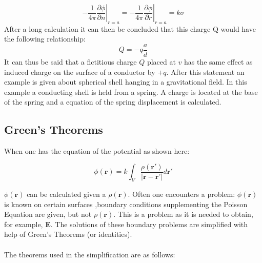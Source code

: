 \begin{equation}
    -\left.\frac{1}{4 \pi} \frac{\partial \phi}{\partial n}\right|_{r=a}=-\left.\frac{1}{4 \pi} \frac{\partial \phi}{\partial r}\right|_{r=a}=k \sigma
\end{equation}
After a long calculation it can then be concluded that this charge Q would have the following relationship:
\begin{equation}
    Q =-q\frac{a}{d}
\end{equation}
It can thus be said that a fictitious charge $Q$ placed at $v$ has the same effect as induced charge on the surface of a conductor by $+q$.
After this statement an example is given about spherical shell hanging in a gravitational field. In this example a conducting shell is held from a spring. A charge is located at the base of the spring and a equation of the spring displacement is calculated.

\subsection{Green's Theorems}
When one has the equation of the potential as shown here:

\begin{equation}
    \phi(\textbf{r}) = k \int_V \frac{\rho(\textbf{r}')}{|\textbf{r}-\textbf{r'}|}d\textbf{r}'
    \label{eq:potential}
\end{equation}

\noindent $\phi(\textbf{r})$ can be calculated given a $\rho(\textbf{r})$. Often one encounters a problem: $\phi(\textbf{r})$ is known on certain surfaces ,boundary conditions supplementing the Poisson Equation are given, but not $\rho(\textbf{r})$. This is a problem as it is needed to obtain, for example, \textbf{E}.
The solutions of these boundary problems are simplified with help of  Green's Theorems (or identities). \\
\\
\noindent The theorems used in the simplification are as follows:

